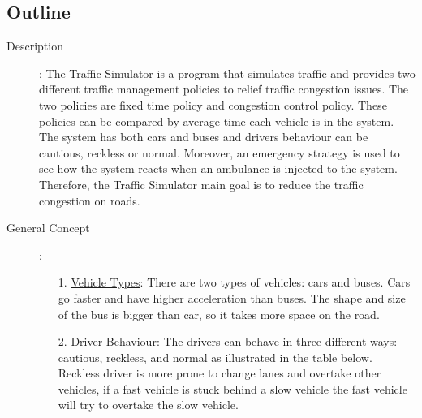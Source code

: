 \documentclass[11pt]{article}
\begin{document}
\subsection{Outline}
\begin{description}
\item[Description]:
The Traffic Simulator is a program that simulates traffic and provides two different traffic management policies to relief traffic congestion issues. The two policies are fixed time policy and congestion control policy. These policies can be compared by average time each vehicle is in the system. The system has both cars and buses and drivers behaviour can be cautious, reckless or normal. Moreover, an emergency strategy is used to see how the system reacts when an ambulance is injected to the system. Therefore, the Traffic Simulator main goal is to reduce the traffic congestion on roads. 
\item[General Concept]:
	\begin{itemize}
		\item[1. ]\underline{Vehicle Types}: There are two types of vehicles: cars and buses. Cars go faster and have higher acceleration than buses. The shape and size of the bus is bigger than car, so it takes more space on the road.
		
		\item[2. ] \underline{Driver Behaviour}: The drivers can behave in three different ways: cautious, reckless, and normal as illustrated in the table below. Reckless driver is more prone to change lanes and overtake other vehicles, if a fast vehicle is stuck behind a slow vehicle the fast vehicle will try to overtake the slow vehicle.


\end{itemize}
\end{description}
\end{document}
